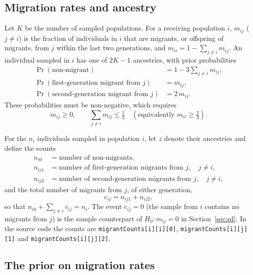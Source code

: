 \documentclass[11pt,a4paper]{article}
\newcommand{\1}{\mathbf{1}}
\begin{document}
\subsection{Migration rates and ancestry}

Let $K$ be the number of sampled populations. For a receiving population $i$,
$m_{ij}$ ($j\neq i$) is the fraction of individuals in $i$ that are migrants,
or offspring of migrants, from $j$ within the last two generations, and
$m_{ii} = 1-\sum_{j\neq i} m_{ij}$. An individual sampled in $i$ has one of
$2K-1$ ancestries, with prior probabilities
\begin{align}
\Pr(\text{non-migrant}) &= 1 - 3\textstyle\sum_{j\neq i} m_{ij}, \label{eq:anc0}\\
\Pr(\text{first-generation migrant from } j) &= m_{ij}, \label{eq:anc1}\\
\Pr(\text{second-generation migrant from } j) &= 2\,m_{ij}. \label{eq:anc2}
\end{align}
These probabilities must be non-negative, which requires
\begin{equation}
m_{ij}\ge 0, \qquad \sum_{j\neq i} m_{ij} \le \tfrac13 \quad(\text{equivalently } m_{ii}\ge \tfrac23).
\label{eq:constraint}
\end{equation}

For the $n_i$ individuals sampled in population $i$, let $z$ denote their
ancestries and define the counts
\begin{align*}
n_{i0} &= \text{number of non-migrants},\\
n_{ij1} &= \text{number of first-generation migrants from } j, \quad j\neq i,\\
n_{ij2} &= \text{number of second-generation migrants from } j, \quad j\neq i,
\end{align*}
and the total number of migrants from $j$, of either generation,
\begin{equation}
c_{ij} = n_{ij1} + n_{ij2},
\label{eq:cij}
\end{equation}
so that $n_{i0} + \sum_{j\neq i} c_{ij} = n_i$. The event $c_{ij}=0$ (the
sample from $i$ contains no migrants from $j$) is the sample counterpart of
$H_0\colon m_{ij}=0$ in Section~\ref{sec:sd}. In the source code the counts
are \texttt{migrantCounts[i][i][0]}, \texttt{migrantCounts[i][j][1]} and
\texttt{migrantCounts[i][j][2]}.

\subsection{The prior on migration rates}
\end{document}
